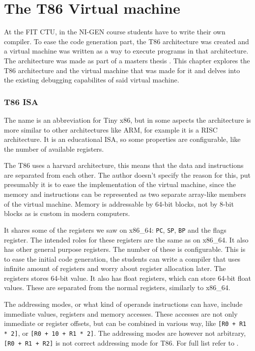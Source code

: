 \chapter{The T86 Virtual machine}
At the FIT CTU, in the NI-GEN course students have to write their own compiler.
To ease the code generation part, the T86 architecture was created and a
virtual machine was written as a way to execute programs in that architecture.
The architecture was made as part of a masters thesis \cite{ivo2021tiny}. This
chapter explores the T86 architecture and the virtual machine that was made for
it and delves into the existing debugging capabilites of said virtual machine.

\subsection{T86 ISA}
The name is an abbreviation for Tiny x86, but in some aspects the architecture
is more similar to other architectures like ARM, for example it is a RISC
architecture. It is an educational ISA, so some properties are configurable,
like the number of available registers.

The T86 uses a harvard architecture, this means that the data and instructions
are separated from each other. The author doesn't specify the reason for this,
put presumably it is to ease the implementation of the virtual machine, since
the memory and instructions can be represented as two separate array-like
members of the virtual machine. Memory is addressable by 64-bit blocks, not
by 8-bit blocks as is custom in modern computers.

It shares some of the registers we saw on x86\_64: \texttt{PC}, \texttt{SP},
\texttt{BP} and the flags register. The intended roles for these registers are
the same as on x86\_64. It also has other general purpose registers. The number
of these is configurable. This is to ease the initial code generation, the students
can write a compiler that uses infinite amount of registers and worry about
register allocation later. The registers stores 64-bit value. It also has
float registers, which can store 64-bit float values. These are separated from
the normal registers, similarly to x86\_64.

The addressing modes, or what kind of operands instructions can have, include
immediate values, registers and memory accesses. These accesses are not only
immediate or register offsets, but can be combined in various way, like
\texttt{[R0 + R1 * 2]}, or \texttt{[R0 + 10 + R1 * 2]}. The addressing modes
are however not arbitrary, \texttt{[R0 + R1 + R2]} is not correct addressing
mode for T86. For full list refer to \cite{ivo2021tiny}.

